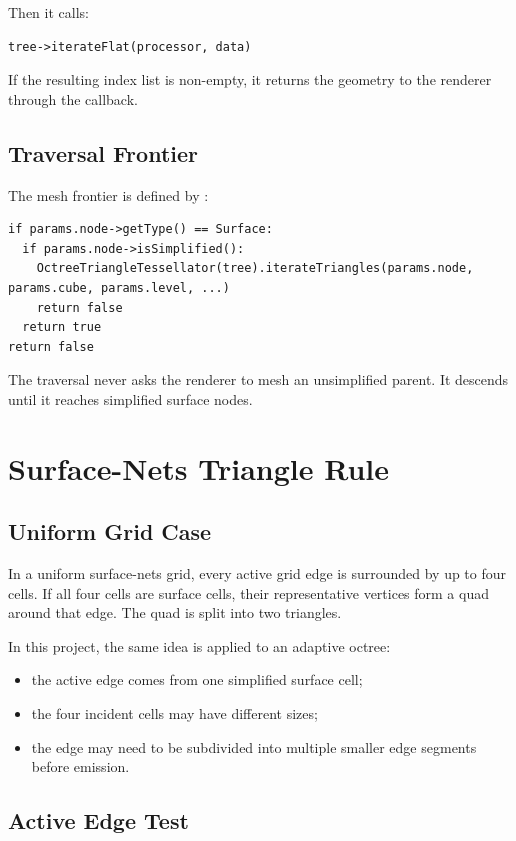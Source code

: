 \documentclass[11pt,a4paper]{article}
\newcommand{\code}[1]{\texttt{\detokenize{#1}}}
\begin{document}
Then it calls:

\begin{lstlisting}
tree->iterateFlat(processor, data)
\end{lstlisting}

If the resulting index list is non-empty, it returns the geometry to the renderer through the callback.

\subsection{Traversal Frontier}

The mesh frontier is defined by \code{Processor::test}:

\begin{lstlisting}
if params.node->getType() == Surface:
  if params.node->isSimplified():
    OctreeTriangleTessellator(tree).iterateTriangles(params.node, params.cube, params.level, ...)
    return false
  return true
return false
\end{lstlisting}

The traversal never asks the renderer to mesh an unsimplified parent. It descends until it reaches simplified surface nodes.

\section{Surface-Nets Triangle Rule}

\subsection{Uniform Grid Case}

In a uniform surface-nets grid, every active grid edge is surrounded by up to four cells. If all four cells are surface cells, their representative vertices form a quad around that edge. The quad is split into two triangles.

In this project, the same idea is applied to an adaptive octree:

\begin{itemize}
    \item the active edge comes from one simplified surface cell;
    \item the four incident cells may have different sizes;
    \item the edge may need to be subdivided into multiple smaller edge segments before emission.
\end{itemize}

\subsection{Active Edge Test}
\end{document}
